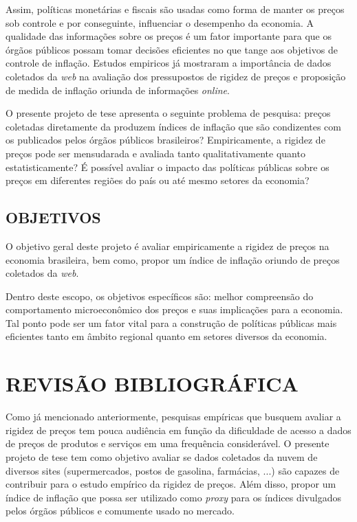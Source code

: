 \documentclass[twoside,a4paper,12pt]{report}
\begin{document}
Assim, políticas monetárias e fiscais são usadas como forma de manter os preços sob controle e por conseguinte, influenciar o desempenho da economia. A qualidade das informações sobre os preços é um fator importante para que os órgãos públicos possam tomar decisões eficientes no que tange aos objetivos de controle de inflação. Estudos empiricos já mostraram a importância de dados coletados da \emph{web} na avaliação dos pressupostos de rigidez de preços e proposição de medida de inflação oriunda de informações \emph{online}.

O presente projeto de tese apresenta o seguinte problema de pesquisa: preços coletadas diretamente da  produzem índices de inflação que são condizentes com os publicados pelos órgãos públicos brasileiros? Empiricamente, a rigidez de preços pode ser mensudarada e avaliada tanto qualitativamente quanto estatisticamente? É possível avaliar o impacto das políticas públicas sobre os preços em diferentes regiões do país ou até mesmo setores da economia?


\section*{OBJETIVOS}

O objetivo geral deste projeto é avaliar empiricamente a rigidez de preços na economia brasileira, bem como, propor um índice de inflação oriundo de preços coletados da \emph{web}.

Dentro deste escopo, os objetivos específicos são: melhor compreensão do comportamento microeconômico dos preços e suas implicações para a economia. Tal ponto pode ser um fator vital para a construção de políticas públicas mais eficientes tanto em âmbito regional quanto em setores diversos da economia.  
\pagestyle{empty}
\cleardoublepage
\pagestyle{fancy}

\chapter{REVISÃO BIBLIOGRÁFICA}\label{cap2}

Como já mencionado anteriormente, pesquisas empíricas que busquem avaliar a rigidez de preços tem pouca audiência em função da dificuldade de acesso a dados de preços de produtos e serviços em uma frequência considerável. O presente projeto de tese tem como objetivo avaliar se dados coletados da nuvem de diversos sites (supermercados, postos de gasolina, farmácias, ...) são capazes de contribuir para o estudo empírico da rigidez de preços. Além disso, propor um índice de inflação que possa ser utilizado como \emph{proxy} para os índices divulgados pelos órgãos públicos e comumente usado no mercado.  
\end{document}
